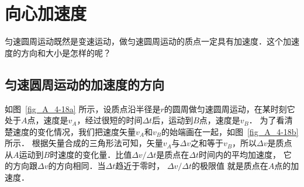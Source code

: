 \section{向心加速度}
匀速圆周运动既然是变速运动，做匀速圆周运动的质点一定具有加速度．这个加速度的方向和大小是怎样的呢？

\subsection{匀速圆周运动的加速度的方向} 

如图~\ref{fig_A_4-18a} 所示，设质点沿半径是$r$的圆周做匀速圆周运动，在某时刻它处于$A$点，速度是$v_A$，经过很短的时间$\Delta t$后，运动到$B$点，速度是$v_B$．
为了看清楚速度的变化情况，我们把速度矢量$v_A$和$v_B$的始端画在一起，如图~\ref{fig_A_4-18b} 所示．
根据矢量合成的三角形法可知，矢量$v_A$与$\Delta v$之和等于$v_B$，所以$\Delta v$是质点从$A$运动到$B$时速度的变化量．比值$\Delta v/\Delta t$是质点在$\Delta t$时间内的平均加速度，
它的方向跟$\Delta v$的方向相同．当$\Delta t$趋近于零时，
$\Delta v/\Delta t$的极限值
就是质点在$A$点的加速度．


